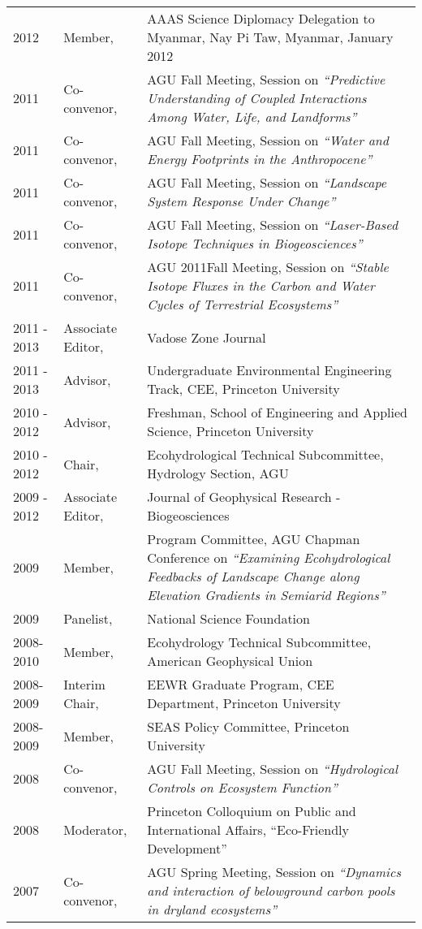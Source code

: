 \documentclass[10pt]{report}
\begin{document}
\begin{longtable}{p{.75in} p{1.1in} p{4.2in}}
2012 & Member, & AAAS Science Diplomacy Delegation to Myanmar, Nay Pi Taw, Myanmar, January 2012 \\
2011  & Co-convenor, & AGU Fall Meeting, Session on \emph{``Predictive Understanding of Coupled Interactions Among Water, Life, and Landforms''} \\
2011  & Co-convenor, & AGU Fall Meeting, Session on \emph{``Water and Energy Footprints in the Anthropocene''} \\
2011  & Co-convenor, & AGU Fall Meeting, Session on \emph{``Landscape System Response Under Change''} \\
2011  & Co-convenor, & AGU Fall Meeting, Session on \emph{``Laser-Based Isotope Techniques in Biogeosciences''} \\
2011  & Co-convenor, & AGU 2011Fall Meeting, Session on \emph{``Stable Isotope Fluxes in the Carbon and Water Cycles of Terrestrial Ecosystems''} \\
2011 - 2013 & Associate Editor, & Vadose Zone Journal \\
2011 - 2013 & Advisor, & Undergraduate Environmental Engineering Track, CEE, Princeton University \\ 
2010 - 2012 & Advisor, & Freshman, School of Engineering and Applied Science, Princeton University \\ 
2010 - 2012 & Chair, & Ecohydrological Technical Subcommittee, Hydrology Section, AGU \\ 
2009 - 2012 & Associate Editor, & Journal of Geophysical Research - Biogeosciences \\ 
2009 & Member, & Program Committee, AGU Chapman Conference on \emph{``Examining Ecohydrological Feedbacks of Landscape Change along Elevation Gradients in Semiarid Regions''} \\
2009 & Panelist, & National Science Foundation  \\
2008-2010         & Member, & Ecohydrology Technical Subcommittee, American Geophysical Union \\
2008-2009 & Interim Chair, & EEWR Graduate Program, CEE Department, Princeton University \\
2008-2009 & Member, & SEAS Policy Committee, Princeton University \\
2008 & Co-convenor, & AGU Fall Meeting, Session on \emph{``Hydrological Controls on Ecosystem Function'' }  \\
2008 & Moderator, & Princeton Colloquium on Public and International Affairs, ``Eco-Friendly Development''  \\
2007 & Co-convenor, & AGU Spring Meeting, Session on \emph{``Dynamics and interaction of belowground carbon pools in dryland ecosystems''} \\

\end{longtable}
\end{document}
